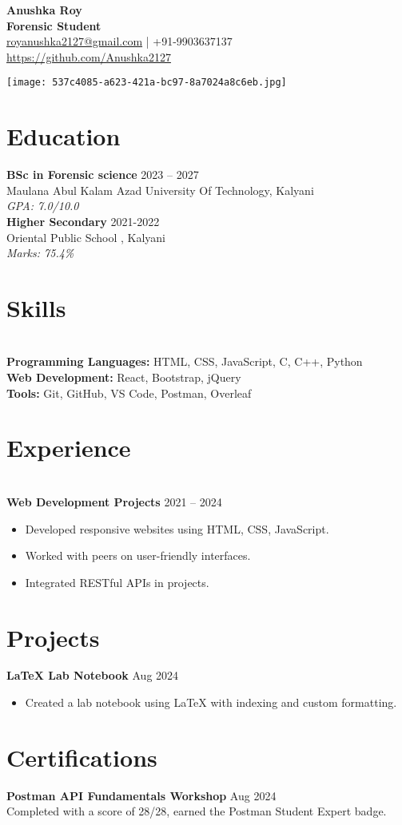 \documentclass[a4paper,11pt]{article}
\makeatletter
\newcommand{\sectionuline}[1]{
    \vspace{6pt}
    \color{sectioncolor}
    \section{#1}
    \vspace{-14pt}
    \uline{\hspace{\textwidth}}
    \vspace{4pt}
    \color{black}
}
\newcommand{\header}{
    \begin{minipage}[t]{0.75\textwidth}
        \centering
        {\LARGE \textbf{Anushka Roy}} \\
        \textbf{Forensic Student} \\
        \href{mailto:royanushka2127@gmail.com}{royanushka2127@gmail.com} | +91-9903637137 \\
        \href{github.com/Anushka2127}{https://github.com/Anushka2127}
    \end{minipage}%
    \begin{minipage}[t]{0.2\textwidth}
        \texttt{[image: 537c4085-a623-421a-bc97-8a7024a8c6eb.jpg]} %
    \end{minipage}
}
\makeatother
\begin{document}
\header


\sectionuline{Education}


\noindent
\textbf{BSc in Forensic science} \hfill 2023 -- 2027 \\
Maulana Abul Kalam Azad University Of Technology, Kalyani \\
\textit{GPA: 7.0/10.0}\\


\noindent
\textbf{Higher Secondary} \hfill 2021-2022\\
Oriental Public School , Kalyani\\
\textit{Marks: 75.4\%}


\sectionuline{Skills}\\
\noindent
\textbf{Programming Languages:} HTML, CSS, JavaScript, C, C++, Python \\
\textbf{Web Development:} React, Bootstrap, jQuery \\
\textbf{Tools:} Git, GitHub, VS Code, Postman, Overleaf \\


\sectionuline{Experience}\\
\noindent
\textbf{Web Development Projects} \hfill 2021 -- 2024


\begin{itemize}
    \item Developed responsive websites using HTML, CSS, JavaScript.
    \item Worked with peers on user-friendly interfaces.
    \item Integrated RESTful APIs in projects.\\
\end{itemize}
\noindent


\sectionuline{Projects}


\noindent
\textbf{LaTeX Lab Notebook} \hfill Aug 2024 


\begin{itemize}
    \item Created a lab notebook using LaTeX with indexing and custom formatting.\\
\end{itemize}


\noindent




\sectionuline{Certifications}


\noindent
\textbf{Postman API Fundamentals Workshop} \hfill Aug 2024 \\
Completed with a score of 28/28, earned the Postman Student Expert badge.
\end{document}
